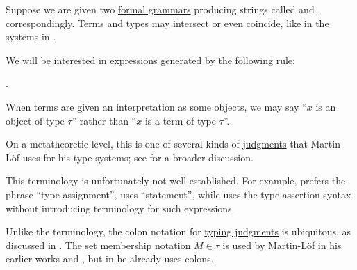 \begin{definition}\label{def:type_assertion}\mimprovised
  Suppose we are given two \hyperref[def:formal_grammar/schema]{formal grammars} producing strings called  and , correspondingly. Terms and types may intersect or even coincide, like in the systems in .

  We will be interested in expressions generated by the following rule:
  \begin{bnf*}
     { \bnfsp \bnftsq{\( : \)} \bnfsp {}}.
  \end{bnf*}
\end{definition}
\begin{comments}
  \item When terms are given an interpretation as some objects, we may say \enquote{\( x \) is an object of type \( \tau \)} rather than \enquote{\( x \) is a term of type \( \tau \)}.

  \item On a metatheoretic level, this is one of several kinds of \hyperref[con:judgment]{judgments} that Martin-L\"of uses for his type systems; see  for a broader discussion.

  \item This terminology is unfortunately not well-established. For example,  prefers the phrase \enquote{type assignment},  uses \enquote{statement}, while  uses the type assertion syntax without introducing terminology for such expressions.

  \item Unlike the terminology, the colon notation for \hyperref[rem:typing_judgments]{typing judgments} is ubiquitous, as discussed in \cite{MathSE:origin_of_colon_notation_for_type_assertions}. The set membership notation \( M \in \tau \) is used by Martin-L\"of in his earlier works \cite{MartinLöf1975IntuitionisticTypeTheory} and \cite{MartinLöf1984IntuitionisticTypeTheory}, but in \cite{MartinLöf1994TypeJudgments} he already uses colons.
\end{comments}

